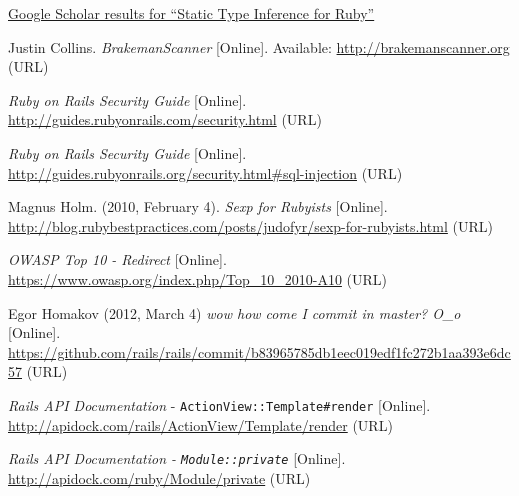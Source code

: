 \documentclass[conference]{IEEEtran}
\begin{document}
\begin{thebibliography}{1}

    \href{http://scholar.google.com/scholar?cites=12614894093793389341&as_sdt=40000005&sciodt=0,22&hl=en}{Google Scholar results for ``Static Type Inference for Ruby''}

    Justin Collins. \emph{BrakemanScanner} [Online]. Available: \url{http://brakemanscanner.org} (URL)

    \emph{Ruby on Rails Security Guide} [Online]. \url{http://guides.rubyonrails.com/security.html} (URL)

    \emph{Ruby on Rails Security Guide} [Online]. \url{http://guides.rubyonrails.org/security.html\#sql-injection} (URL)

    Magnus Holm. (2010, February 4). \emph{Sexp for Rubyists} [Online]. \url{http://blog.rubybestpractices.com/posts/judofyr/sexp-for-rubyists.html} (URL)

    \emph{OWASP Top 10 - Redirect} [Online]. \url{https://www.owasp.org/index.php/Top_10_2010-A10} (URL)

    Egor Homakov (2012, March 4) \emph{wow how come I commit in master? O\_o} [Online]. \url{https://github.com/rails/rails/commit/b83965785db1eec019edf1fc272b1aa393e6dc57} (URL)

    \emph{Rails API Documentation} - \texttt{ActionView::Template\#render} [Online]. \url{http://apidock.com/rails/ActionView/Template/render} (URL)

    \emph{Rails API Documentation - \texttt{Module::private}} [Online]. \url{http://apidock.com/ruby/Module/private} (URL)

\end{thebibliography}
\end{document}
